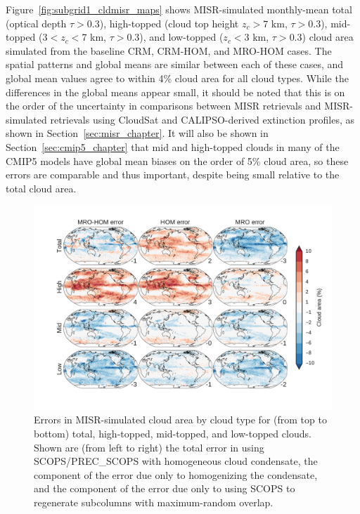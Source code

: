 Figure~\ref{fig:subgrid1_cldmisr_maps} shows MISR-simulated monthly-mean
total (optical depth \(\tau > 0.3\)), high-topped (cloud top height
\(z_c > 7\) km, \(\tau > 0.3\)), mid-topped (\(3 < z_c < 7\) km,
\(\tau > 0.3\)), and low-topped (\(z_c < 3\) km, \(\tau > 0.3\)) cloud
area simulated from the baseline CRM, CRM-HOM, and MRO-HOM cases. The
spatial patterns and global means are similar between each of these
cases, and global mean values agree to within 4\% cloud area for all
cloud types. While the differences in the global means appear small, it
should be noted that this is on the order of the uncertainty in
comparisons between MISR retrievals and MISR-simulated retrievals using
CloudSat and CALIPSO-derived extinction profiles, as shown in
Section~\ref{sec:misr_chapter}. It will also be shown in
Section~\ref{sec:cmip5_chapter} that mid and high-topped clouds in many
of the CMIP5 models have global mean biases on the order of 5\% cloud
area, so these errors are comparable and thus important, despite being
small relative to the total cloud area.

\begin{figure}[htbp]
\centering
\includegraphics{graphics/subgrid1_cldmisr_maps_diff.pdf}
\caption{\label{fig:subgrid1_cldmisr_maps_diff}Errors in MISR-simulated
cloud area by cloud type for (from top to bottom) total, high-topped,
mid-topped, and low-topped clouds. Shown are (from left to right) the
total error in using SCOPS/PREC\_SCOPS with homogeneous cloud
condensate, the component of the error due only to homogenizing the
condensate, and the component of the error due only to using SCOPS to
regenerate subcolumns with maximum-random
overlap.}\label{fig:subgrid1ux5fcldmisrux5fmapsux5fdiff}
\end{figure}


